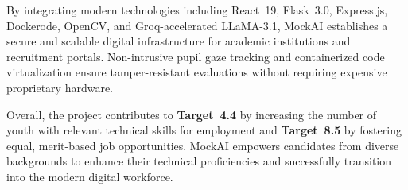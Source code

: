 \documentclass[12pt,a4paper]{report}
\begin{document}
\vspace{0.4cm}
\noindent By integrating modern technologies including React~19, Flask~3.0, Express.js,
Dockerode, OpenCV, and Groq-accelerated LLaMA-3.1, MockAI establishes a secure and
scalable digital infrastructure for academic institutions and recruitment portals.
Non-intrusive pupil gaze tracking and containerized code virtualization ensure
tamper-resistant evaluations without requiring expensive proprietary hardware.

\vspace{0.4cm}
\noindent Overall, the project contributes to \textbf{Target~4.4} by increasing the number of
youth with relevant technical skills for employment and \textbf{Target~8.5} by fostering
equal, merit-based job opportunities. MockAI empowers candidates from diverse backgrounds
to enhance their technical proficiencies and successfully transition into the modern digital
workforce.
\end{document}
